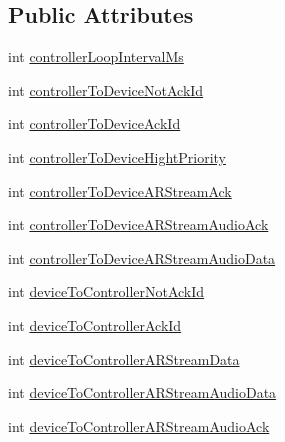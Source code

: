 \subsection*{Public Attributes}
\begin{DoxyCompactItemize}
\item 
int \hyperlink{struct_a_r_d_i_s_c_o_v_e_r_y___network_configuration__t_a87b25e0a2d9f0fb6e70c75e494e25aa0}{controller\+Loop\+Interval\+Ms}
\item 
int \hyperlink{struct_a_r_d_i_s_c_o_v_e_r_y___network_configuration__t_a851ee517194a3afcd06b246d42d549ed}{controller\+To\+Device\+Not\+Ack\+Id}
\item 
int \hyperlink{struct_a_r_d_i_s_c_o_v_e_r_y___network_configuration__t_a021dbceef99ecf215067a24e59b70d88}{controller\+To\+Device\+Ack\+Id}
\item 
int \hyperlink{struct_a_r_d_i_s_c_o_v_e_r_y___network_configuration__t_a38adc125e4a11ce2e610ae3492e5c2df}{controller\+To\+Device\+Hight\+Priority}
\item 
int \hyperlink{struct_a_r_d_i_s_c_o_v_e_r_y___network_configuration__t_ac82b109db84d4cd2f7fa9dd38c13714f}{controller\+To\+Device\+A\+R\+Stream\+Ack}
\item 
int \hyperlink{struct_a_r_d_i_s_c_o_v_e_r_y___network_configuration__t_a11f0c6789ec5b80ac2964eb9f9f6d245}{controller\+To\+Device\+A\+R\+Stream\+Audio\+Ack}
\item 
int \hyperlink{struct_a_r_d_i_s_c_o_v_e_r_y___network_configuration__t_a0a92b94f82852a6f71835261c85b5218}{controller\+To\+Device\+A\+R\+Stream\+Audio\+Data}
\item 
int \hyperlink{struct_a_r_d_i_s_c_o_v_e_r_y___network_configuration__t_a61c4264ca162bfc4d89470db4df9092a}{device\+To\+Controller\+Not\+Ack\+Id}
\item 
int \hyperlink{struct_a_r_d_i_s_c_o_v_e_r_y___network_configuration__t_ac8557f88a70a0cfa2bc3959e19f86bb4}{device\+To\+Controller\+Ack\+Id}
\item 
int \hyperlink{struct_a_r_d_i_s_c_o_v_e_r_y___network_configuration__t_a0029c20cbacc369e165de42b85909f49}{device\+To\+Controller\+A\+R\+Stream\+Data}
\item 
int \hyperlink{struct_a_r_d_i_s_c_o_v_e_r_y___network_configuration__t_a2f75593ecc615176852ae80a05e97a10}{device\+To\+Controller\+A\+R\+Stream\+Audio\+Data}
\item 
int \hyperlink{struct_a_r_d_i_s_c_o_v_e_r_y___network_configuration__t_ad6d31ad8b692603fa679197e2f2d8bc1}{device\+To\+Controller\+A\+R\+Stream\+Audio\+Ack}
\item 

\end{DoxyCompactItemize}
